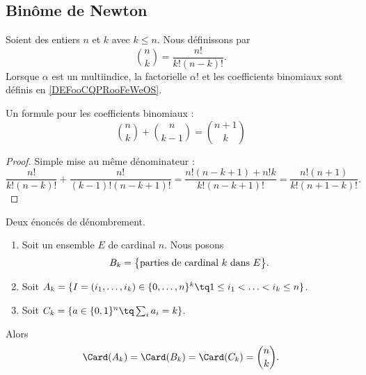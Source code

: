 \subsection{Binôme de Newton}


\begin{definition}		\label{DEFooHXNFooOBKgqD}
	Soient des entiers \( n\) et \( k\) avec \( k\leq n\). Nous définissons  par
	\begin{equation}		\label{EQooJJYGooTvmSAt}
		{n\choose k} = \frac{ n! }{ k!(n-k)! }.
	\end{equation}
	Lorsque \( \alpha\) est un multiindice, la factorielle \( \alpha!\) et les coefficients binomiaux sont définis en \ref{DEFooCQPRooFeWeOS}.
\end{definition}

\begin{lemma}		\label{LEMooHWMNooIINsxu}
	Un formule pour les coefficients binomiaux :
	\begin{equation}
		{n\choose k}+{n\choose k-1}={n+1\choose k}
	\end{equation}
\end{lemma}

\begin{proof}
	Simple mise au même dénominateur :
	\begin{equation}
		\frac{ n! }{ k!(n-k)! }+\frac{ n! }{ (k-1)!(n-k+1)! }=\frac{ n!(n-k+1)+n!k }{ k!(n-k+1)! }=\frac{ n!(n+1) }{  k!(n+1-k)!  }.
	\end{equation}
\end{proof}

\begin{lemma}		\label{LEMooUTDTooXAmvdF}
	Deux énoncés de dénombrement.
	\begin{enumerate}
		\item
		      Soit un ensemble \( E\) de cardinal \( n\). Nous posons
		      \begin{equation}
			      B_k  =\big\{ \text{parties de cardinal \( k\) dans \( E\)} \big\}.
		      \end{equation}
		\item
		      Soit \(  A_k  =\{ I=(i_1,\ldots,i_k)\in\{ 0,\ldots,n \}^k\tq 1\leq i_1<\ldots <i_k\leq n \}\).
		\item
		      Soit \( C_k=\{ a\in\{ 0,1 \}^n\tq \sum_ia_i=k \}\).
	\end{enumerate}
	Alors
	\begin{equation}
		\Card(A_k)=\Card(B_k)=\Card(C_k)={n\choose k}.
	\end{equation}
\end{lemma}

